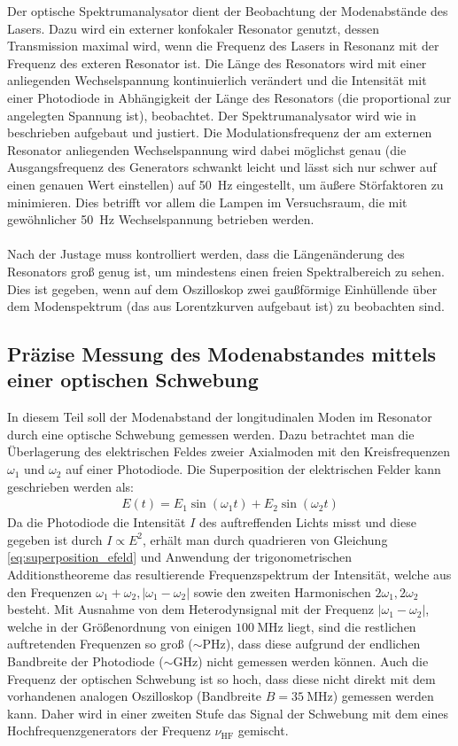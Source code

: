 \documentclass[11pt, a4paper]{article}
\numberwithin{equation}{section}
\begin{document}
Der optische Spektrumanalysator dient der Beobachtung der Modenabstände des Lasers.
Dazu wird ein externer konfokaler Resonator genutzt, dessen Transmission maximal wird, wenn die Frequenz des Lasers in Resonanz mit der Frequenz des exteren Resonator ist.
Die Länge des Resonators wird mit einer anliegenden Wechselspannung kontinuierlich verändert und die Intensität mit einer Photodiode in Abhängigkeit der Länge des Resonators (die proportional zur angelegten Spannung ist), beobachtet.
Der Spektrumanalysator wird wie in \cite{anleitung} beschrieben aufgebaut und justiert.
Die Modulationsfrequenz der am externen Resonator anliegenden Wechselspannung wird dabei möglichst genau (die Ausgangsfrequenz des Generators schwankt leicht und lässt sich nur schwer auf einen genauen Wert einstellen) auf \SI{50}{\hertz} eingestellt, um äußere Störfaktoren zu minimieren.
Dies betrifft vor allem die Lampen im Versuchsraum, die mit gewöhnlicher \SI{50}{\hertz} Wechselspannung betrieben werden.\\
\\
Nach der Justage muss kontrolliert werden, dass die Längenänderung des Resonators groß genug ist, um mindestens einen freien Spektralbereich zu sehen.
Dies ist gegeben, wenn auf dem Oszilloskop zwei gaußförmige Einhüllende über dem Modenspektrum (das aus Lorentzkurven aufgebaut ist) zu beobachten sind.

\subsection{Präzise Messung des Modenabstandes mittels einer optischen Schwebung}
In diesem Teil soll der Modenabstand der longitudinalen Moden im Resonator durch eine optische Schwebung gemessen werden.
Dazu betrachtet man die Überlagerung des elektrischen Feldes zweier Axialmoden mit den Kreisfrequenzen $\omega_1$ und $\omega_2$ auf einer Photodiode.
Die Superposition der elektrischen Felder kann geschrieben werden als:
\begin{align}
	E(t) = E_1 \sin(\omega_1 t) + E_2 \sin(\omega_2 t)
	\label{eq:superposition_efeld}
\end{align}
Da die Photodiode die Intensität $I$ des auftreffenden Lichts misst und diese gegeben ist durch $I \propto E^2$, erhält man durch quadrieren von Gleichung \ref{eq:superposition_efeld} und Anwendung der trigonometrischen Additionstheoreme das resultierende Frequenzspektrum der Intensität, welche aus den Frequenzen $\omega_1 + \omega_2, |\omega_1 - \omega_2|$ sowie den zweiten Harmonischen $2\omega_1, 2\omega_2$ besteht.
Mit Ausnahme von dem Heterodynsignal mit der Frequenz $|\omega_1 - \omega_2|$, welche in der Größenordnung von einigen $\SI{100}{\mega\hertz}$ liegt, sind die restlichen auftretenden Frequenzen so groß ($\sim \si{\peta\hertz}$), dass diese aufgrund der endlichen Bandbreite der Photodiode ($\sim \si{\giga\hertz}$) nicht gemessen werden können.
Auch die Frequenz der optischen Schwebung ist so hoch, dass diese nicht direkt mit dem vorhandenen analogen Oszilloskop (Bandbreite $B = \SI{35}{\mega\hertz}$) gemessen werden kann.
Daher wird in einer zweiten Stufe das Signal der Schwebung mit dem eines Hochfrequenzgenerators der Frequenz $\nu_\mathrm{HF}$ gemischt.
\end{document}
